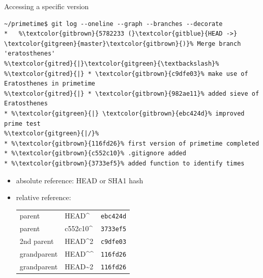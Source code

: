 \documentclass[svgnames]{beamer}
\begin{document}
\begin{frame}[fragile]{Accessing a specific version}
 \begin{lstlisting}[escapechar=\%]
~/primetime$ git log --oneline --graph --branches --decorate
*   %\textcolor{gitbrown}{5782233 (}\textcolor{gitblue}{HEAD ->} \textcolor{gitgreen}{master}\textcolor{gitbrown}{)}% Merge branch 'eratosthenes'
%\textcolor{gitred}{|}\textcolor{gitgreen}{\textbackslash}%  
%\textcolor{gitred}{|} * \textcolor{gitbrown}{c9dfe03}% make use of Eratosthenes in primetime
%\textcolor{gitred}{|} * \textcolor{gitbrown}{982ae11}% added sieve of Eratosthenes
* %\textcolor{gitgreen}{|} \textcolor{gitbrown}{ebc424d}% improved prime test
%\textcolor{gitgreen}{|/}%  
* %\textcolor{gitbrown}{116fd26}% first version of primetime completed
* %\textcolor{gitbrown}{c552c10}% .gitignore added
* %\textcolor{gitbrown}{3733ef5}% added function to identify times
 \end{lstlisting}
 \begin{itemize}
  \item absolute reference: HEAD or SHA1 hash
  \item relative reference:\\[0.1truecm]
        \begin{tabular}{lll}
         parent & HEAD\textasciicircum & \texttt{ebc424d}\\
         parent & c552c10\textasciicircum & \texttt{3733ef5}\\
         2nd parent & HEAD\textasciicircum2 & \texttt{c9dfe03}\\
         grandparent & HEAD\textasciicircum\textasciicircum & \texttt{116fd26}\\
         grandparent & HEAD\textasciitilde2 & \texttt{116fd26}\\
        \end{tabular}
 \end{itemize}
\end{frame}
\end{document}
